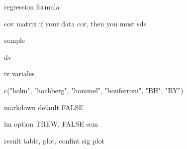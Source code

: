 \documentclass[a4paper]{book}
\begin{document}
%
\begin{Arguments}
\begin{ldescription}
\item[\code{formula}] regression formula

\item[\code{cov}] cov matrix if your data cor, then you must sds

\item[\code{n}] sample

\item[\code{dv}] dv

\item[\code{ivs}] iv variales

\item[\code{method}] c("holm", "hochberg", "hommel", "bonferroni", "BH", "BY")

\item[\code{md}] markdown default FALSE

\item[\code{lm}] lm option TREW, FALSE sem
\end{ldescription}
\end{Arguments}
%
\begin{Value}
result table, plot, confint sig plot
\end{Value}
%
\end{document}
